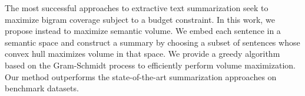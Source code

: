 The most successful approaches to extractive text summarization seek to maximize bigram coverage subject to a budget constraint. In this work, we propose instead to maximize semantic volume. We embed each sentence in a semantic space and construct a summary by choosing a subset of sentences whose convex hull maximizes volume in that space. We provide a greedy algorithm based on the Gram-Schmidt process to efficiently perform volume maximization. Our method outperforms the state-of-the-art summarization approaches on benchmark datasets.
